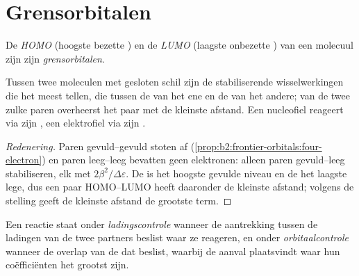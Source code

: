 \section{Grensorbitalen}

\begin{definition}[Grensorbitalen]\label{def:b2:frontier-orbitals:frontier}
De \emph{HOMO} (hoogste bezette ) en de
\emph{LUMO} (laagste onbezette ) van een molecuul zijn zijn
\emph{grensorbitalen}.
\end{definition}

\begin{proposition}\label{prop:b2:frontier-orbitals:dominant}
Tussen twee moleculen met gesloten schil zijn de stabiliserende wisselwerkingen die het meest tellen,
die tussen de  van het ene en de  van het andere; van de twee zulke paren overheerst het paar
met de kleinste afstand. Een nucleofiel reageert via zijn , een
elektrofiel via zijn .
\end{proposition}

\begin{proof}[Redenering]
Paren gevuld--gevuld stoten af (\cref{prop:b2:frontier-orbitals:four-electron}) en paren leeg--leeg
bevatten geen elektronen: alleen paren gevuld--leeg stabiliseren, elk met $2\beta^2/\Delta\varepsilon$.
De  is het hoogste gevulde niveau en de  het laagste lege, dus een
paar HOMO--LUMO heeft daaronder de kleinste afstand; volgens de stelling geeft de kleinste afstand
de grootste term.
\end{proof}

\begin{definition}\label{def:b2:frontier-orbitals:control}
Een reactie staat onder \emph{ladingscontrole} wanneer de aantrekking
tussen de ladingen van de twee partners beslist waar ze reageren, en onder
\emph{orbitaalcontrole} wanneer de overlap van de 
dat beslist, waarbij de aanval plaatsvindt waar hun coëfficiënten het grootst zijn.
\end{definition}

